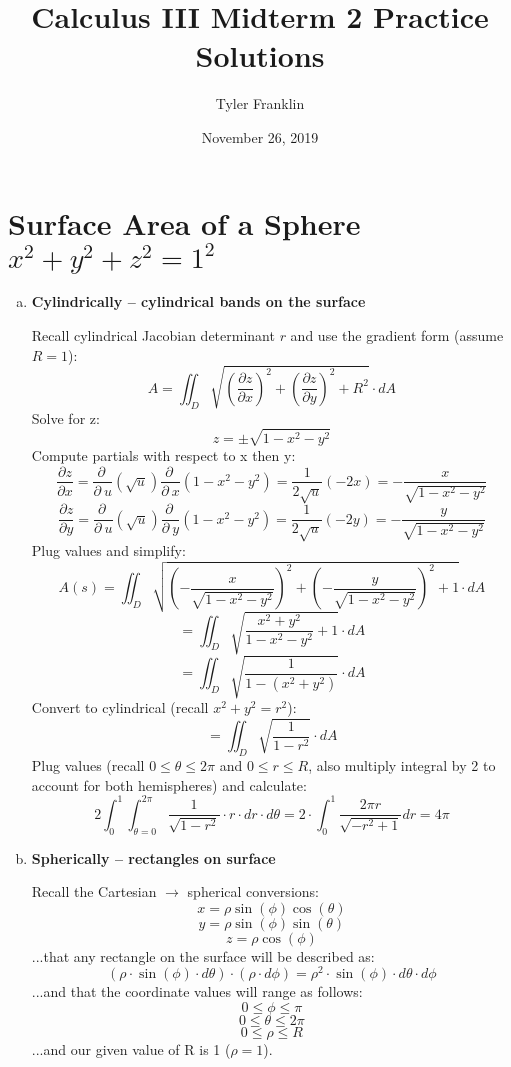 \documentclass{article}
\title{Calculus III Midterm 2 Practice Solutions}
\author{Tyler Franklin}
\date{November 26, 2019}
\begin{document}
\maketitle

\section{Surface Area of a Sphere $x^2 + y^2 + z^2 = 1^2$ }
\begin{enumerate}[a.]
    \item \textbf{Cylindrically -- cylindrical bands on the surface }

          Recall cylindrical Jacobian determinant $ r $ and use the gradient form (assume $R = 1$):
          \[ A = \iint_{D}\sqrt{ (\frac{\partial z}{\partial x})^2 + (\frac{\partial z}{\partial y})^2 + R^2 } \cdot dA \]
          Solve for z:
          \[ z = \pm\sqrt{1-x^{2}-y^{2}} \]
          Compute partials with respect to x then y:
          \[ \frac{\partial z}{\partial x} = \frac{\partial \:}{\partial \:u}\left(\sqrt{u}\right)\frac{\partial \:}{\partial \:x}\left(1-x^2-y^2\right) = \frac{1}{2\sqrt{u}}\left(-2x\right) = -\frac{x}{\sqrt{1-x^2-y^2}} \]
          \[ \frac{\partial z}{\partial y} = \frac{\partial \:}{\partial \:u}\left(\sqrt{u}\right)\frac{\partial \:}{\partial \:y}\left(1-x^2-y^2\right) = \frac{1}{2\sqrt{u}}\left(-2y\right) = -\frac{y}{\sqrt{1-x^2-y^2}} \]
          Plug values and simplify:
          \[ A(s) = \iint_{D}\sqrt{\left(-\frac{x}{\sqrt{1-x^2-y^2}}\right)^2+\left(-\frac{y}{\sqrt{1-x^2-y^2}}\right)^2+1}  \cdot dA \]
          \[ = \iint_{D}\sqrt{\frac{x^2+y^2}{1-x^2-y^2}+1}  \cdot dA \]
          \[ = \iint_{D}\sqrt{\frac{1}{1-(x^2+y^2)}}  \cdot dA \]
          Convert to cylindrical (recall $x^2 + y^2 = r^2$):
          \[ = \iint_{D}\sqrt{\frac{1}{1-r^2}}  \cdot dA \]
          Plug values (recall $0 \leq \theta \leq 2\pi $ and $0 \leq r \leq R $, also multiply integral by 2 to account for both hemispheres) and calculate:
          \[ 2\int_{0}^{1}\int_{\theta=0}^{2\pi} \frac{1}{\sqrt{1-r^2}}\cdot r \cdot dr \cdot d\theta = 2\cdot \int _0^1\frac{2\pi r}{\sqrt{-r^2+1}}dr = 4\pi \]

    \item \textbf{Spherically -- rectangles on surface}

          Recall the Cartesian $\rightarrow$ spherical conversions:
          \[ x = \rho\sin(\phi)\cos(\theta)   \]
          \[ y = \rho\sin(\phi)\sin(\theta)  \]
          \[ z = \rho\cos(\phi)  \]
          ...that any rectangle on the surface will be described as:
          \[ (\rho\cdot\sin(\phi)\cdot d \theta)\cdot(\rho\cdot d \phi) = \rho^2\cdot\sin(\phi)\cdot d\theta\cdot d\phi \]
          ...and that the coordinate values will range as follows:
          \[ 0 \leq \phi \leq \pi  \]
          \[ 0 \leq \theta \leq 2\pi  \]
          \[ 0 \leq \rho \leq R \]
          ...and our given value of R is 1 ($\rho = 1$).


\end{enumerate}
\end{document}
